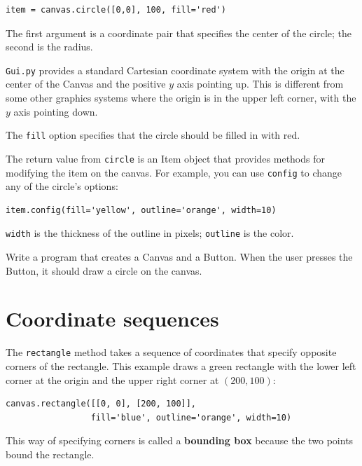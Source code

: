 \documentclass[10pt]{book}
\begin{document}
\begin{verbatim}
item = canvas.circle([0,0], 100, fill='red')
\end{verbatim}
%
The first argument is a coordinate pair that specifies the
center of the circle; the second is the radius.

{\tt Gui.py} provides a standard Cartesian coordinate system with
the origin at the center of the Canvas and the positive $y$ axis
pointing up.  This is different from some other graphics systems
where the origin is in the upper left corner, with the $y$ axis
pointing down.

The {\tt fill} option specifies that the circle should be filled
in with red.

The return value from {\tt circle} is an Item object that
provides methods for modifying the item on the canvas.  For
example, you can use {\tt config} to change any of the circle's
options:

\begin{verbatim}
item.config(fill='yellow', outline='orange', width=10)
\end{verbatim}
%
{\tt width} is the thickness of the outline in pixels;
{\tt outline} is the color.

\begin{exercise}
\label{circle}

Write a program that creates a Canvas and a Button.  When the
user presses the Button, it should draw a circle on the canvas.

\end{exercise}


\section{Coordinate sequences}

The {\tt rectangle} method takes a sequence of coordinates that
specify opposite corners of the rectangle.  This example
draws a green rectangle with the lower left corner at the origin
and the upper right corner at $(200,100)$:

\begin{verbatim}
canvas.rectangle([[0, 0], [200, 100]],
                 fill='blue', outline='orange', width=10)
\end{verbatim}
%
This way of specifying corners is called
a {\bf bounding box} because the two points
bound the rectangle.
\end{document}
